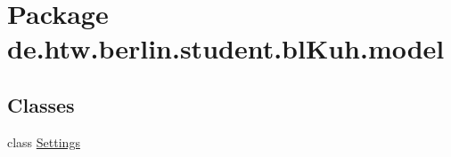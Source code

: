 \hypertarget{namespacede_1_1htw_1_1berlin_1_1student_1_1bl_kuh_1_1model}{\section{Package de.\-htw.\-berlin.\-student.\-bl\-Kuh.\-model}
\label{namespacede_1_1htw_1_1berlin_1_1student_1_1bl_kuh_1_1model}
}
\subsection*{Classes}
\begin{DoxyCompactItemize}
\item 
class \hyperlink{classde_1_1htw_1_1berlin_1_1student_1_1bl_kuh_1_1model_1_1_settings}{Settings}
\end{DoxyCompactItemize}
